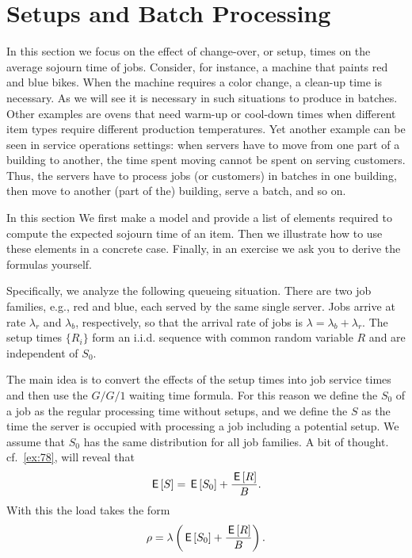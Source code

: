 \section{Setups and Batch Processing}
\label{sec:setups-batch-proc}



In this section we focus on the effect of change-over, or setup, times on the average sojourn time of jobs.
Consider, for instance, a machine that paints red and blue bikes.
When the machine requires a color change, a clean-up time is necessary.
As we will see it is necessary in such situations to produce in batches.
Other examples are ovens that need warm-up or cool-down times when different item types require different production temperatures.
Yet another example can be seen in service operations settings: when servers have to move from one part of a building to another, the time spent moving cannot be spent on serving customers.
Thus, the servers have to process jobs (or customers) in batches in one building, then move to another (part of the) building, serve a batch, and so on.

In this section We first make a model and provide a list of elements required to compute the expected sojourn time of an item.
Then we illustrate how to use these elements in a concrete case.
Finally, in an exercise we ask you to derive the formulas yourself.


Specifically, we analyze the following queueing situation.
There are two job families, e.g., red and blue, each served by the same single server.
Jobs arrive at rate $\lambda_r$ and $\lambda_b$, respectively, so that the arrival rate of jobs is $\lambda= \lambda_b+\lambda_r$.
The setup times $\{R_i\}$ form an i.i.d.
sequence with common random variable $R$ and are independent of $S_0$.

The main idea is to convert the effects of the setup times into job service times and then use the $G/G/1$ waiting time formula.
For this reason we define the  $S_0$ of a job as the regular processing time without setups, and we define the  $S$ as the time the server is occupied with processing a job including a potential setup.
We assume that $S_0$ has the same distribution for all job families.
A bit of thought. cf.~\cref{ex:78}, will reveal that 
\begin{equation}\label{eq:81}
    \,\mathsf{E}\left[S\right] = \,\mathsf{E}\left[S_0\right] + \frac{\,\mathsf{E}\left[R\right]} B.
\end{equation}
With this the load takes the form
\begin{equation*}
\rho = \lambda \left(\,\mathsf{E}\left[S_0\right] + \frac{\,\mathsf{E}\left[R\right]}B\right).
\end{equation*}

